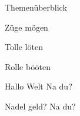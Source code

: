 \documentclass{beamer}
\begin{document}
\begin{slide}{Themenüberblick}
    \begin{bulletpoints}[<+->]
        \item Züge mögen
        \item Tolle löten
        \item Rolle bööten
    \end{bulletpoints}
\end{slide}

\begin{slide}{Hallo Welt}
    Na du? \\
    \lipsum[2]
\end{slide}

\begin{slide}{Nadel geld?}
    Na du? \\
    \lipsum[2]
\end{slide}
\end{document}
